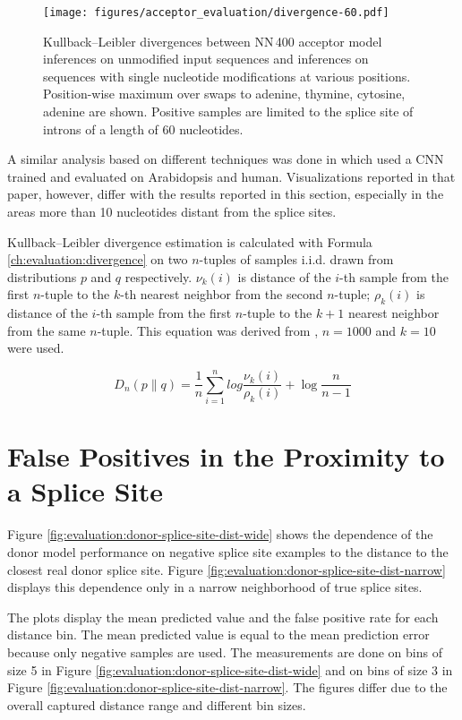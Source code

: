 \begin{figure}
  \centering
  \texttt{[image: figures/acceptor\_evaluation/divergence-60.pdf]}
  \caption{Kullback–Leibler divergences between NN\,400 acceptor model
    inferences on unmodified input sequences and inferences on sequences with
    single nucleotide modifications at various positions. Position-wise maximum
    over swaps to adenine, thymine, cytosine, adenine are shown. Positive
    samples are limited to the splice site of introns of a length of 60
    nucleotides.}
  \label{fig:evaluation:acceptor-divergence-60}
\end{figure}

A similar analysis based on different techniques was done in
\cite{zuallaert2018splicerover} which used a CNN trained and evaluated on
Arabidopsis and human. Visualizations reported in that paper, however, differ
with the results reported in this section, especially in the areas more than 10
nucleotides distant from the splice sites.

Kullback–Leibler divergence estimation is calculated with Formula
\ref{ch:evaluation:divergence} on two $n$-tuples of samples i.i.d. drawn from
distributions $p$ and $q$ respectively. $\nu_k(i)$ is distance of the $i$-th
sample from the first $n$-tuple to the $k$-th nearest neighbor from the second
$n$-tuple; $\rho_k(i)$ is distance of the $i$-th sample from the first
$n$-tuple to the $k + 1$ nearest neighbor from the same $n$-tuple. This
equation was derived from \cite{wang2006nearest}, $n = 1000$ and $k = 10$ were
used.

\begin{equation}
  D_{n}(p \parallel q) = \frac{1}{n} \sum_{i = 1}^n log
  \frac{\nu_k(i)}{\rho_k(i)} + \log \frac{n}{n - 1}
  \label{ch:evaluation:divergence}
\end{equation}

\section{\label{ch:evaluation:proximity}False Positives in the Proximity to a Splice Site}

Figure \ref{fig:evaluation:donor-splice-site-dist-wide} shows the dependence of
the donor model performance on negative splice site examples to the distance to
the closest real donor splice site. Figure
\ref{fig:evaluation:donor-splice-site-dist-narrow} displays this dependence
only in a narrow neighborhood of true splice sites.

The plots display the mean predicted value and the false positive rate for each
distance bin. The mean predicted value is equal to the mean prediction error
because only negative samples are used. The measurements are done on bins of
size 5 in Figure \ref{fig:evaluation:donor-splice-site-dist-wide} and on bins
of size 3 in Figure \ref{fig:evaluation:donor-splice-site-dist-narrow}. The
figures differ due to the overall captured distance range and different bin
sizes.


